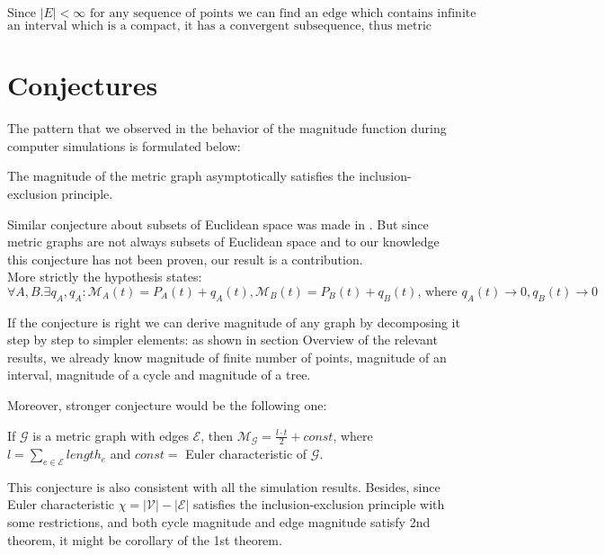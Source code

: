 \documentclass{article}
\begin{document}
$$
\text{Since } |E| < \infty \text{ for any sequence of points we can find an edge which contains infinite subsequence and since edge is}$$
$$\text{an interval which is a compact, it has a convergent subsequence, thus metric graph is a compact.}
$$

\section{Conjectures}

The pattern that we observed in the behavior of the magnitude function during 
computer simulations is formulated below:

\begin{hypothesis}
    The magnitude of the metric graph asymptotically satisfies the inclusion-exclusion principle.
\end{hypothesis}
Similar conjecture about subsets of Euclidean space was made in \textcite{Leinster_2012}.
But since metric graphs are not always subsets of Euclidean space and to our knowledge
this conjecture has not been proven, our result is a contribution.
\\

More strictly the hypothesis states:
$$\forall A, B . \exists q_A, q_A : \mathcal{M}_A(t) = P_A(t) + q_A(t), \mathcal{M}_B(t) = P_B(t) 
+ q_B(t) \text{, where } q_A(t) \rightarrow 0, q_B(t) \rightarrow 0$$


If the conjecture is right we can derive magnitude of any graph by decomposing 
it step by step to simpler elements: as shown in section Overview of the relevant results,
we already know magnitude of finite number of points, magnitude of an interval,
magnitude of a cycle and magnitude of a tree.

Moreover, stronger conjecture would be the following one:

\begin{hypothesis} If $\mathcal{G}$ is a metric graph with edges $\mathcal{E}$, then
    $\mathcal{M}_{\mathcal{G}} = \frac{l \cdot t}{2} + const$, where 
    $l = \sum_{e \in \mathcal{E}} length_e$ and $const =$ Euler characteristic of $\mathcal{G}$. 
\end{hypothesis}

This conjecture is also consistent with all the simulation results.
Besides, since Euler characteristic $\chi = |\mathcal{V}| - |\mathcal{E}|$ \textcite{_awniczak_2020}
satisfies the inclusion-exclusion principle with some restrictions, 
and both cycle magnitude and edge magnitude satisfy 2nd theorem, it might be corollary of the 1st theorem.
\\
\end{document}
